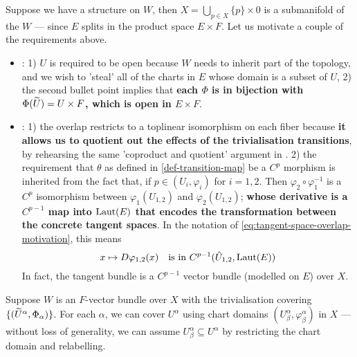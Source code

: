 \documentclass[../main-v2-manifolds.tex]{subfiles}
\begin{document}
Suppose we have a structure on $W$, then $X=\bigcup_{p\in X}\{p\}\times 0$ is a submanifold of the $W$ --- since $E$ splits in the product space $E\times F$. Let us motivate a couple of the requirements above.
\begin{itemize}
    \item {}: 1) $U$ is required to be open because $W$ needs to inherit part of the topology, and we wish to 'steal' all of the charts in $E$ whose domain is a subset of $U$, 2) the second bullet point implies that \textbf{each $\Phi$ is in bijection with $\Phi(\widetilde{U}) = U\times F$, which is open in $E\times F$}.
    \item {}: 
    1) the overlap restricts to a toplinear isomorphism on each fiber because \textbf{it allows us to quotient out the effects of the trivialisation transitions}, by rehearsing the same 'coproduct and quotient' argument in .
    2) the requirement that $\theta$ as defined in \cref{def-transition-map} be a $C^p$ morphism is inherited from the fact that, if $p\in (U_i,\varphi_i)$ for $i=1,2$. Then $\varphi_2\circ \varphi_1^{-1}$ is a $C^p$ isomorphism between $\varphi_1(U_{1,2})$ and $\varphi_2(U_{1,2})$; \textbf{whose derivative is a $C^{p-1}$ map into $\operatorname{Laut}(E)$ that encodes the transformation between the concrete tangent spaces}. In the notation of \cref{eq:tangent-space-overlap-motivation}, this means
    \[
        x\mapsto D\varphi_{1,2}(x)\quad\text{is in } C^{p-1}(\hat{U}_{1,2}, \operatorname{Laut}(E))
    \]
    In fact, the tangent bundle is a $C^{p-1}$ vector bundle (modelled on $E$) over $X$.
\end{itemize}
Suppose $W$ is an $F$-vector bundle over $X$ with the trivialisation covering $\{(\widetilde{U}^\alpha, \Phi_\alpha)\}$. For each $\alpha$, we can cover $U^\alpha$ using chart domains $(U^\alpha_\beta, \varphi^\alpha_\beta)$ in $X$ --- without loss of generality, we can assume $U^\alpha_\beta\subseteq U^\alpha$ by restricting the chart domain and relabelling. \\
\end{document}
